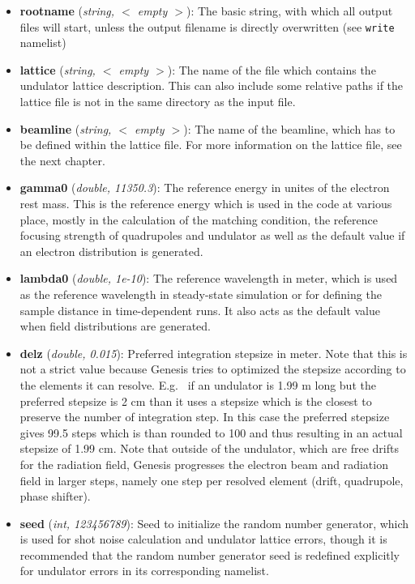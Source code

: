 \documentclass[12pt]{book}
\begin{document}
\begin{itemize}
\item {\bf rootname} ({\it string, $<$ empty $>$}): The basic string, with which all output files will start, unless the output filename is directly overwritten (see {\tt write} namelist)

\item {\bf lattice} ({\it string, $<$ empty $>$}): The name of the file which contains the undulator lattice description. This can also include some relative paths if the lattice file is not in the same directory as the input file.

\item{\bf beamline} ({\it string, $<$ empty $>$}): The name of the beamline, which has to be defined within the lattice file. For more information on the lattice file, see the next chapter.

\item {\bf gamma0} ({\it double, 11350.3}): The reference energy in unites of the electron rest mass. This is the reference energy which is used in the code at various place, mostly in the calculation of the matching condition, the reference focusing strength of quadrupoles and undulator as well as the default value if an electron distribution is generated.

\item {\bf lambda0} ({\it double, 1e-10}): The reference wavelength in meter, which is used as the reference wavelength in steady-state simulation or for defining the sample distance in time-dependent runs. It also acts as the default value when field distributions are generated.


\item {\bf delz} ({\it double, 0.015}): Preferred integration stepsize in meter. Note that this is not a strict value because Genesis tries to optimized the stepsize according to the elements it can resolve. E.g.~ if an undulator is 1.99 m long but the preferred stepsize is 2 cm than it uses a stepsize which is the closest to preserve the number of integration step. In this case the preferred stepsize gives 99.5 steps which is than rounded to 100 and thus resulting in an actual stepsize of 1.99 cm.  Note that outside of the undulator, which are free drifts for the radiation field, Genesis progresses the electron beam and radiation field in larger steps, namely one step per resolved element (drift, quadrupole, phase shifter).

\item {\bf seed} ({\it int, 123456789}): Seed to initialize the random number generator, which is used for shot noise calculation and undulator lattice errors, though it is recommended that the random number generator seed is redefined explicitly for undulator errors in its corresponding namelist.


\end{itemize}
\end{document}
